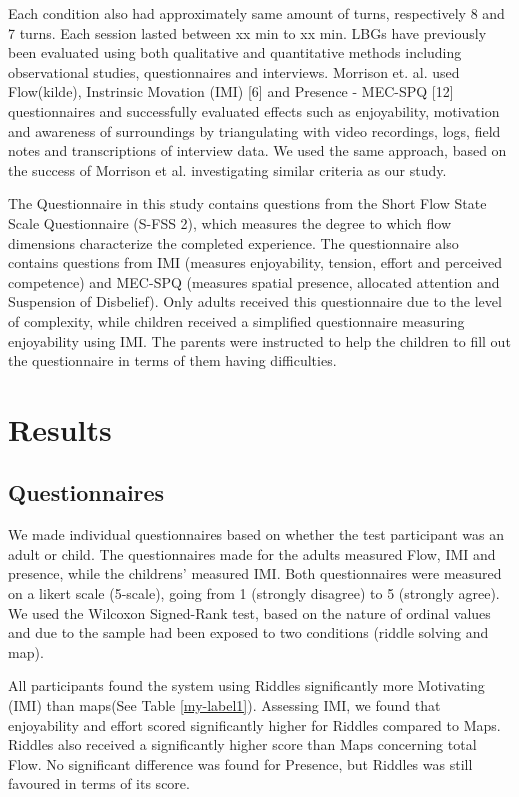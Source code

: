 Each condition also had approximately same amount of turns, respectively 8 and 7 turns. Each session lasted between xx min to xx min. LBGs have previously been evaluated using both qualitative and quantitative methods including observational studies, questionnaires and interviews. Morrison et. al. used Flow(kilde), Instrinsic Movation (IMI) [6] and Presence - MEC-SPQ [12] questionnaires and successfully evaluated effects such as enjoyability, motivation and awareness of surroundings by triangulating with video recordings, logs, field notes and transcriptions of interview data. We used the same approach, based on the success of Morrison et al. investigating similar criteria as our study. 

The Questionnaire in this study contains questions from the Short Flow State Scale Questionnaire (S-FSS 2), which measures the degree to which flow dimensions characterize the
completed experience. The questionnaire also contains questions from IMI (measures enjoyability, tension, effort and perceived competence) and MEC-SPQ (measures spatial presence, allocated attention and Suspension of Disbelief). Only adults received this questionnaire due to the level of complexity, while children received a simplified questionnaire measuring enjoyability using IMI. The parents were instructed to help the children to fill out the questionnaire in terms of them having difficulties. 
 
\section{Results}

\subsection{Questionnaires}
We made individual questionnaires based on whether the test participant was an adult or child. The questionnaires made for the adults measured Flow, IMI and presence, while the childrens' measured IMI. Both questionnaires were measured on a likert scale (5-scale), going from 1 (strongly disagree) to 5 (strongly agree). We used the Wilcoxon Signed-Rank test, based on the nature of ordinal values and due to the sample had been exposed to two conditions (riddle solving and map).

All participants found the system using Riddles significantly more Motivating (IMI) than maps(See Table \ref{my-label1}). Assessing IMI, we found that enjoyability and effort scored significantly higher for Riddles compared to Maps. Riddles also received a significantly higher score than Maps concerning total Flow. No significant difference was found for Presence, but Riddles was still favoured in terms of its score. 

